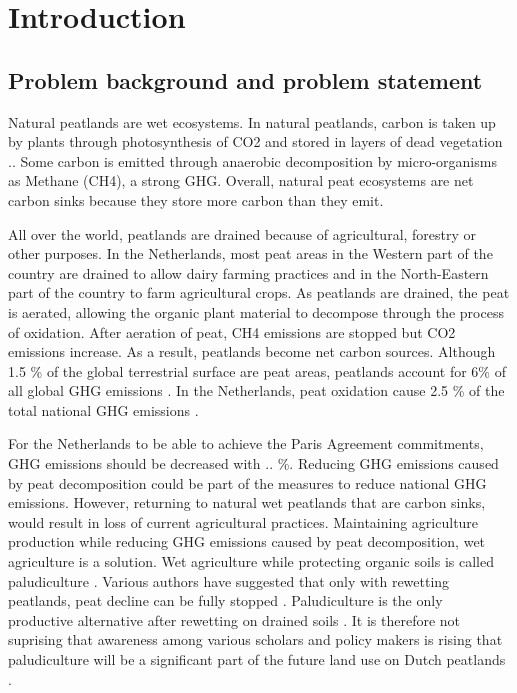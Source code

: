 \chapter{Introduction}

\section{Problem background and problem statement}

Natural peatlands are wet ecosystems. In natural peatlands, carbon is taken up by plants through photosynthesis of \ac{CO2} and stored in layers of dead vegetation \citep{clymo1984limits}.. Some carbon is emitted through anaerobic decomposition by micro-organisms as Methane (CH4), a strong \ac{GHG}. Overall, natural peat ecosystems are net carbon sinks because they store more carbon than they emit.

All over the world, peatlands are drained because of agricultural, forestry or other purposes. In the Netherlands, most peat areas in the Western part of the country are drained to allow dairy farming practices and in the North-Eastern part of the country to farm agricultural crops. As peatlands are drained, the peat is aerated, allowing the organic plant material to decompose through the process of oxidation. After aeration of peat, CH4 emissions are stopped but CO2 emissions increase. As a result, peatlands become net carbon sources. Although 1.5 \% of the global terrestrial surface are peat areas, peatlands account for 6\% of all global \ac{GHG} emissions \citep{joosten2012peatlands}. In the Netherlands, peat oxidation cause 2.5 \% of the total national GHG emissions \citep{van2010emission}. 

For the Netherlands to be able to achieve the Paris Agreement commitments, GHG emissions should be decreased with .. \%. Reducing GHG emissions caused by peat decomposition could be part of the measures to reduce national GHG emissions. However, returning to natural wet peatlands that are carbon sinks, would result in loss of current agricultural practices. Maintaining agriculture production while reducing GHG emissions caused by peat decomposition, wet agriculture is a solution. Wet agriculture while protecting organic soils is called paludiculture \citep{joosten2002wise}. Various authors have suggested that only with rewetting peatlands, peat decline can be fully stopped \citep{van2016dalende, wichtmann2016paludiculture}. Paludiculture is the only productive alternative after rewetting on drained soils \citep{wichtmann2016paludiculture}. It is therefore not suprising that awareness among various scholars and policy makers is rising that paludiculture will be a significant part of the future land use on Dutch peatlands \citep{abel2013database, wichtmann2016paludiculture, Wichmann20151063}. 

